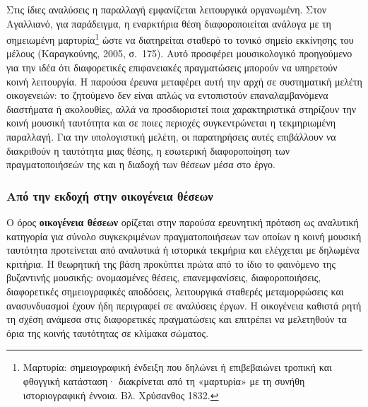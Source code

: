 \documentclass[11pt,a4paper]{article}
\begin{document}
Στις ίδιες αναλύσεις η παραλλαγή εμφανίζεται λειτουργικά οργανωμένη. Στον Αγαλλιανό, για παράδειγμα, η εναρκτήρια θέση διαφοροποιείται ανάλογα με τη σημειωμένη μαρτυρία\footnote{Μαρτυρία: σημειογραφική ένδειξη που δηλώνει ή επιβεβαιώνει τροπική και φθογγική κατάσταση· διακρίνεται από τη «μαρτυρία» με τη συνήθη ιστοριογραφική έννοια. Βλ. Χρύσανθος 1832.} ώστε να διατηρείται σταθερό το τονικό σημείο εκκίνησης του μέλους (Καραγκούνης, 2005, σ.~175). Αυτό προσφέρει μουσικολογικό προηγούμενο για την ιδέα ότι διαφορετικές επιφανειακές πραγματώσεις μπορούν να υπηρετούν κοινή λειτουργία. Η παρούσα έρευνα μεταφέρει αυτή την αρχή σε συστηματική μελέτη οικογενειών: το ζητούμενο δεν είναι απλώς να εντοπιστούν επαναλαμβανόμενα διαστήματα ή ακολουθίες, αλλά να προσδιοριστεί ποια χαρακτηριστικά στηρίζουν την κοινή μουσική ταυτότητα και σε ποιες περιοχές συγκεντρώνεται η τεκμηριωμένη παραλλαγή. Για την υπολογιστική μελέτη, οι παρατηρήσεις αυτές επιβάλλουν να διακριθούν η ταυτότητα μιας θέσης, η εσωτερική διαφοροποίηση των πραγματοποιήσεών της και η διαδοχή των θέσεων μέσα στο έργο.

\subsubsection{Από την εκδοχή στην οικογένεια θέσεων}

Ο όρος \textbf{οικογένεια θέσεων} ορίζεται στην παρούσα ερευνητική πρόταση ως αναλυτική κατηγορία για σύνολο συγκεκριμένων πραγματοποιήσεων των οποίων η κοινή μουσική ταυτότητα προτείνεται από αναλυτικά ή ιστορικά τεκμήρια και ελέγχεται με δηλωμένα κριτήρια. Η θεωρητική της βάση προκύπτει πρώτα από το ίδιο το φαινόμενο της βυζαντινής μουσικής: ονομασμένες θέσεις, επανεμφανίσεις, διαφοροποιήσεις, διαφορετικές σημειογραφικές αποδόσεις, λειτουργικά σταθερές μεταμορφώσεις και ανασυνδυασμοί έχουν ήδη περιγραφεί σε αναλύσεις έργων. Η οικογένεια καθιστά ρητή τη σχέση ανάμεσα στις διαφορετικές πραγματώσεις και επιτρέπει να μελετηθούν τα όρια της κοινής ταυτότητας σε κλίμακα σώματος.
\end{document}
